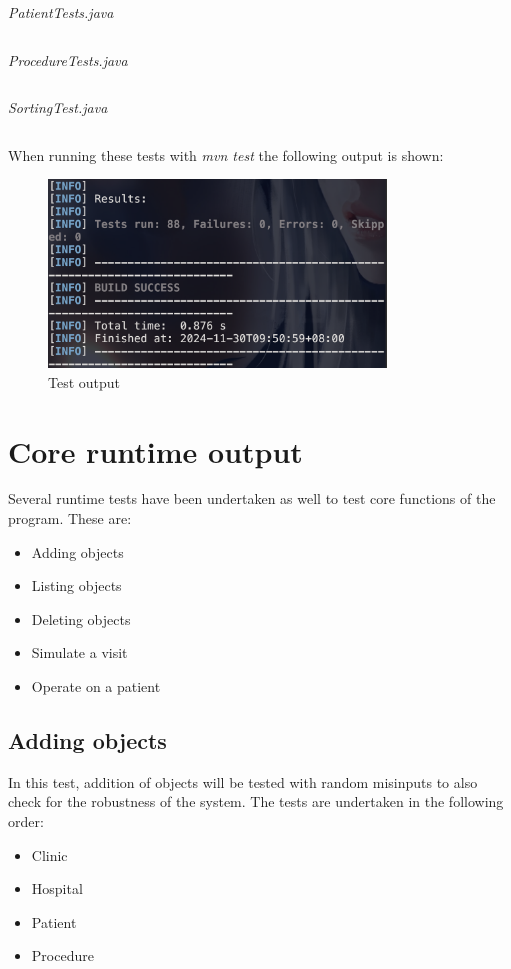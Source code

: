 \documentclass{article}
\begin{document}
	\textit{PatientTests.java} 
	\inputminted{java}{src/test/java/com/yvesstraten/medicalconsole/tests/PatientTests.java}

	\textit{ProcedureTests.java} 
	\inputminted{java}{src/test/java/com/yvesstraten/medicalconsole/tests/ProcedureTests.java}

	\textit{SortingTest.java}\label{sorting_tests} 
	\inputminted{java}{src/test/java/com/yvesstraten/medicalconsole/tests/SortingTest.java}

	When running these tests with \textit{mvn test} the following output is shown:
	\begin{figure}
		\begin{center}
			\includegraphics[width=0.8\textwidth]{figures/Mvn_test.png}
		\end{center}
		\caption{Test output}\label{fig:}
	\end{figure}
	

	\newpage

	\section{Core runtime output}\label{sec:runtime_output} %
	Several runtime tests have been undertaken as well to test core functions of the program. These are:
	\begin{itemize}
		\item Adding objects
		\item Listing objects
		\item Deleting objects
		\item Simulate a visit
		\item Operate on a patient
	\end{itemize}

	\subsection{Adding objects}\label{sub:adding_objects} %
	In this test, addition of objects will be tested with random misinputs to also check for the robustness of the system. The tests are undertaken in the following order: 
	\begin{itemize}
		\item Clinic 
		\item Hospital 
		\item Patient
		\item Procedure
	\end{itemize}
\end{document}
